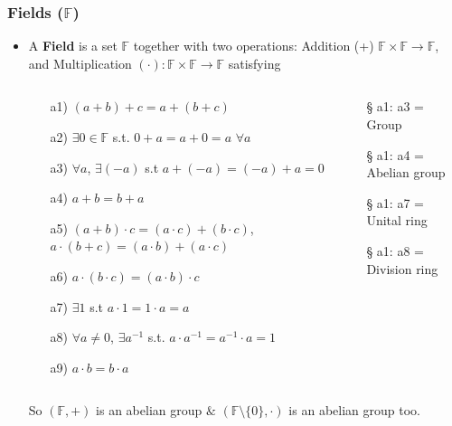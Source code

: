 \documentclass[aspectratio=169,xcolor=dvipsnames,svgnames,x11names,fleqn]{beamer}
\begin{document}
\begin{frame}
\frametitle{Fields ($\mathbb{F}$)}
\begin{itemize}
    \item A \textbf{Field} is a set $\mathbb{F}$ together with two operations:  Addition (+) $\mathbb{F} \times \mathbb{F} \to \mathbb{F}$, and 
Multiplication $(\cdot): \mathbb{F} \times \mathbb{F} \to \mathbb{F}$ satisfying

\footnotesize

\begin{columns}
\begin{column}{0.6\textwidth}
\begin{itemize}
    \item[a1)] $(a+b)+c = a+(b+c)$
    \item[a2)] $\exists 0 \in \mathbb{F}$ s.t. $0+a=a+0=a$ $\forall a$
    \item[a3)] $\forall a$, $\exists (-a)$ s.t $a+(-a)=(-a)+a=0$
    \item[a4)] $a+b = b+a$
    \item[a5)] $(a+b) \cdot c =(a \cdot c)+(b \cdot c)$, $a \cdot (b+c)=(a \cdot b)+(a \cdot c)$
    \item[a6)] $a \cdot (b \cdot c) =(a \cdot b) \cdot c$
    \item[a7)] $\exists 1$ s.t $a \cdot 1 = 1 \cdot a = a$
    \item[a8)] $\forall a \neq 0$, $\exists a^{-1}$ s.t. $a \cdot a^{-1} = a^{-1} \cdot a = 1$
    \item[a9)] $a \cdot b = b \cdot a$
\end{itemize}
\end{column}
\begin{column}{0.35\textwidth}
    \begin{itemize}
        \item[\S] a1: a3 = Group
        \item [\S] a1: a4 = Abelian group
        \item [\S] a1: a7 = Unital ring
        \item [\S] a1: a8 = Division ring
    \end{itemize}
\end{column}
\end{columns}

\vspace{0.3cm}
So $(\mathbb{F},+)$ is an abelian group $\&$ $(\mathbb{F} \setminus \{0\}, \cdot)$ is an abelian group too.

\end{itemize}
\end{frame}
\end{document}
